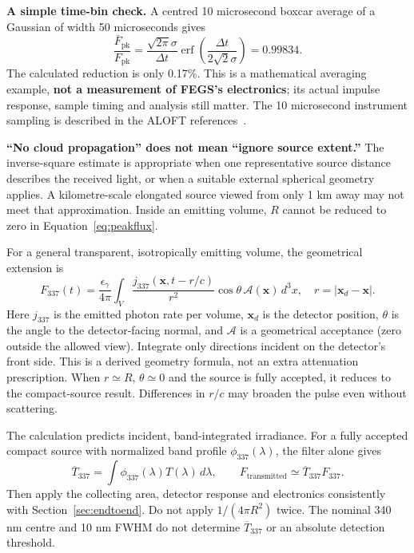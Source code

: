 \documentclass[11pt,a4paper]{article}
\begin{document}
\textbf{A simple time-bin check.} A centred 10 microsecond boxcar average of a Gaussian of width 50 microseconds gives
\[
 \frac{\overline F_{\mathrm{pk}}}{F_{\mathrm{pk}}}
 =\frac{\sqrt{2\pi}\sigma}{\Delta t}
 \operatorname{erf}\!\left(\frac{\Delta t}{2\sqrt{2}\sigma}\right)
 =0.99834.
\]
The calculated reduction is only 0.17\%. This is a mathematical averaging example, \textbf{not a measurement of FEGS's electronics}; its actual impulse response, sample timing and analysis still matter. The 10 microsecond instrument sampling is described in the ALOFT references~\cite{Fuglestad2026}.

\textbf{``No cloud propagation'' does not mean ``ignore source extent.''} The inverse-square estimate is appropriate when one representative source distance describes the received light, or when a suitable external spherical geometry applies. A kilometre-scale elongated source viewed from only 1 km away may not meet that approximation. Inside an emitting volume, $R$ cannot be reduced to zero in Equation~\eqref{eq:peakflux}.

For a general transparent, isotropically emitting volume, the geometrical extension is
\begin{equation}
 F_{337}(t)=\frac{\epsilon_\gamma}{4\pi}
 \int_V
 \frac{j_{337}(\mathbf{x},t-r/c)}{r^2}
 \cos\theta\,\mathcal A(\mathbf{x})\,d^3x,
 \quad r=|\mathbf{x}_{d}-\mathbf{x}|.
 \label{eq:extendedflux}
\end{equation}
Here $j_{337}$ is the emitted photon rate per volume, $\mathbf{x}_d$ is the detector position, $\theta$ is the angle to the detector-facing normal, and $\mathcal A$ is a geometrical acceptance (zero outside the allowed view). Integrate only directions incident on the detector's front side. This is a derived geometry formula, not an extra attenuation prescription. When $r\simeq R$, $\theta\simeq0$ and the source is fully accepted, it reduces to the compact-source result. Differences in $r/c$ may broaden the pulse even without scattering.

\begin{keybox}
The calculation predicts incident, band-integrated irradiance. For a fully accepted compact source with normalized band profile $\phi_{337}(\lambda)$, the filter alone gives
\[
 \overline T_{337}=\int\phi_{337}(\lambda)T(\lambda)\,d\lambda,
 \qquad F_{\mathrm{transmitted}}\simeq\overline T_{337}F_{337}.
\]
Then apply the collecting area, detector response and electronics consistently with Section~\ref{sec:endtoend}. Do not apply $1/(4\pi R^2)$ twice. The nominal 340 nm centre and 10 nm FWHM do not determine $\overline T_{337}$ or an absolute detection threshold.
\end{keybox}
\end{document}
